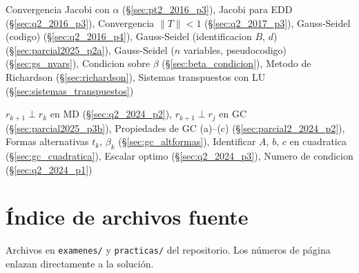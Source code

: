 \documentclass[11pt,a4paper]{article}
\begin{document}
\begin{description}[style=multiline, leftmargin=5.5cm, font=\bfseries]
  \item[Metodos iterativos]
    Convergencia Jacobi con $\alpha$ (\S\ref{sec:pt2_2016_p3}),
    Jacobi para EDD (\S\ref{sec:q2_2016_p3}),
    Convergencia $\|T\|<1$ (\S\ref{sec:q2_2017_p3}),
    Gauss-Seidel (codigo) (\S\ref{sec:q2_2016_p4}),
    Gauss-Seidel (identificacion $B$, $d$) (\S\ref{sec:parcial2025_p2a}),
    Gauss-Seidel ($n$ variables, pseudocodigo) (\S\ref{sec:gs_nvars}),
    Condicion sobre $\beta$ (\S\ref{sec:beta_condicion}),
    Metodo de Richardson (\S\ref{sec:richardson}),
    Sistemas transpuestos con LU (\S\ref{sec:sistemas_transpuestos})

  \item[Minimo Descenso y GC]
    $r_{k+1}\perp r_k$ en MD (\S\ref{sec:q2_2024_p2}),
    $r_{k+1}\perp r_j$ en GC (\S\ref{sec:parcial2025_p3b}),
    Propiedades de GC (a)--(c) (\S\ref{sec:parcial2_2024_p2}),
    Formas alternativas $t_k$, $\beta_k$ (\S\ref{sec:gc_altformas}),
    Identificar $A$, $b$, $c$ en cuadratica (\S\ref{sec:gc_cuadratica}),
    Escalar optimo (\S\ref{sec:q2_2024_p3}),
    Numero de condicion (\S\ref{sec:q2_2024_p1})
\end{description}

\newpage

\label{pgarchivos}
\section*{\'Indice de archivos fuente}

Archivos en \texttt{examenes/} y \texttt{practicas/} del repositorio.
Los n\'umeros de p\'agina enlazan directamente a la soluci\'on.
\end{document}

